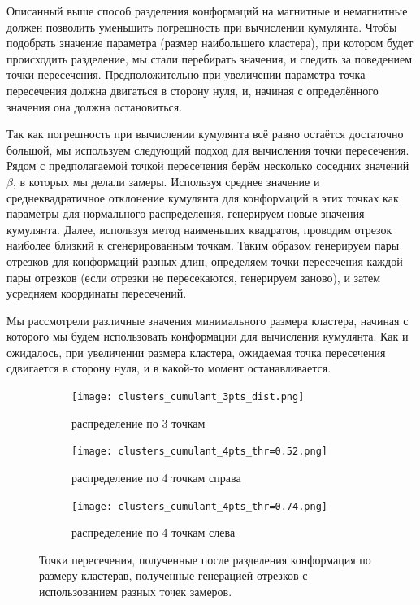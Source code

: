 Описанный выше способ разделения конформаций на магнитные и немагнитные должен позволить уменьшить погрешность при вычислении кумулянта. Чтобы подобрать значение параметра (размер наибольшего кластера), при котором будет происходить разделение, мы стали перебирать значения, и следить за поведением точки пересечения. Предположительно при увеличении параметра точка пересечения должна двигаться в сторону нуля, и, начиная с определённого значения она должна остановиться.

Так как погрешность при вычислении кумулянта всё равно остаётся достаточно большой, мы используем следующий подход для вычисления точки пересечения. Рядом с предполагаемой точкой пересечения берём несколько соседних значений $\beta$, в которых мы делали замеры. Используя среднее значение и среднеквадратичное отклонение кумулянта для конформаций в этих точках как параметры для нормального распределения, генерируем новые значения кумулянта. Далее, используя метод наименьших квадратов, проводим отрезок наиболее близкий к сгенерированным точкам. Таким образом генерируем пары отрезков для конформаций разных длин, определяем точки пересечения каждой пары отрезков (если отрезки не пересекаются, генерируем заново), и затем усредняем координаты пересечений.

Мы рассмотрели различные значения минимального размера кластера, начиная с которого мы будем использовать конформации для вычисления кумулянта. Как и ожидалось, при увеличении размера кластера, ожидаемая точка пересечения сдвигается в сторону нуля, и в какой-то момент останавливается.

\begin{figure}[ht]
	\centering
	\begin{subfigure}[t]{0.3\textwidth}
		\texttt{[image: clusters\_cumulant\_3pts\_dist.png]}
		\caption{распределение по 3 точкам}
	\end{subfigure}
	\begin{subfigure}[t]{0.3\textwidth}
		\texttt{[image: clusters\_cumulant\_4pts\_thr=0.52.png]}
		\caption{распределение по 4 точкам справа}
	\end{subfigure}
	\begin{subfigure}[t]{0.3\textwidth}
		\texttt{[image: clusters\_cumulant\_4pts\_thr=0.74.png]}
		\caption{распределение по 4 точкам слева}
	\end{subfigure}
	\caption{Точки пересечения, полученные после разделения конформация по размеру кластерав, полученные генерацией отрезков с использованием разных точек замеров.}
	\label{fig:ditrib_intersection}
\end{figure}

